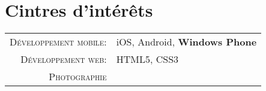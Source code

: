 %
%
%

\section{
  \texorpdfstring{\color{Blue}Cintres d'intérêts}{Contres d'intérêts}
 }

\begin{tabular}{rl}
    \textsc{Développement mobile:} & iOS, Android, \textbf{Windows Phone} \\
    \textsc{Développement web:}    & HTML5, CSS3                          \\ 
    \textsc{Photographie}          &                                      \\
\end{tabular}